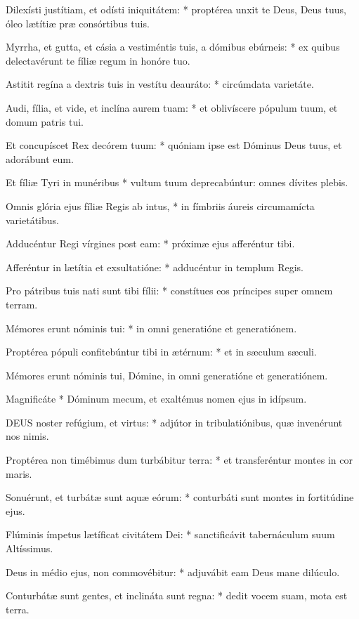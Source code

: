 Dilexísti justítiam, et odísti iniquitátem: * proptérea unxit te Deus, Deus tuus, óleo lætítiæ præ consórtibus tuis.

Myrrha, et gutta, et cásia a vestiméntis tuis, a dómibus ebúrneis: * ex quibus delectavérunt te fíliæ regum in honóre tuo.

Astitit regína a dextris tuis in vestítu deauráto: * circúmdata varietáte.

Audi, fília, et vide, et inclína aurem tuam: * et oblivíscere pópulum tuum, et domum patris tui.

Et concupíscet Rex decórem tuum: * quóniam ipse est Dóminus Deus tuus, et adorábunt eum.

Et fíliæ Tyri in munéribus * vultum tuum deprecabúntur: omnes dívites plebis.

Omnis glória ejus fíliæ Regis ab intus, * in fímbriis áureis circumamícta varietátibus.

Adducéntur Regi vírgines post eam: * próximæ ejus afferéntur tibi.

Afferéntur in lætítia et exsultatióne: * adducéntur in templum Regis.

Pro pátribus tuis nati sunt tibi fílii: * constítues eos príncipes super omnem terram.

Mémores erunt nóminis tui: * in omni generatióne et generatiónem.

Proptérea pópuli confitebúntur tibi in ætérnum: * et in sæculum sæculi.

 Mémores erunt nóminis tui, Dómine, in omni generatióne et generatiónem.

 Magnificáte * Dóminum mecum, et exaltémus nomen ejus in idípsum.


\lettrine[lines=2]{D}{EUS} noster refúgium, et virtus: * adjútor in tribulatiónibus, quæ invenérunt nos nimis.

Proptérea non timébimus dum turbábitur terra: * et transferéntur montes in cor maris.

Sonuérunt, et turbátæ sunt aquæ eórum: * conturbáti sunt montes in fortitúdine ejus.

Flúminis ímpetus lætíficat civitátem Dei: * sanctificávit tabernáculum suum Altíssimus.

Deus in médio ejus, non commovébitur: * adjuvábit eam Deus mane dilúculo.

Conturbátæ sunt gentes, et inclináta sunt regna: * dedit vocem suam, mota est terra.

